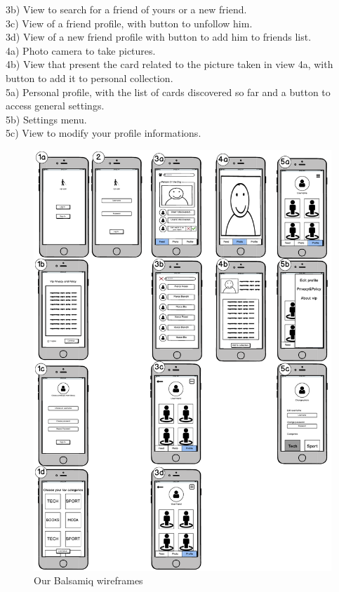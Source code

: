 \documentclass[12pt]{scrartcl}
\begin{document}
	3b) View to search for a friend of yours or a new friend.\\
	3c) View of a friend profile, with button to unfollow him.\\
	3d) View of a new friend profile with button to add him to friends list.\\

	4a) Photo camera to take pictures.\\
	4b) View that present the card related to the picture taken in view 4a, with button to add it to personal collection.\\

	5a) Personal profile, with the list of cards discovered so far and a button to access general settings.\\

	5b) Settings menu.\\
	5c) View to modify your profile informations.\\
	
	\begin{figure}[H]
        		\centering
       		\includegraphics[width=\textwidth]{wireframes.pdf}
       		\caption{Our Balsamiq wireframes}
        		\label{wireframes}
	\end{figure}
	
\end{document}
